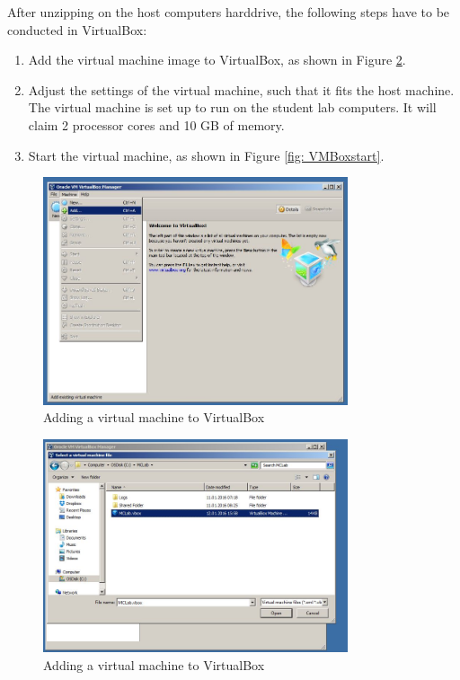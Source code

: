\documentclass[a4paper,twoside,english]{report}
\begin{document}
After unzipping on the host computers harddrive, the following steps
have to be conducted in VirtualBox:
\begin{enumerate}
\item Add the virtual machine image to VirtualBox, as shown in Figure \ref{fig: VMBoxadd}.
\item Adjust the settings of the virtual machine, such that it fits the
host machine. The virtual machine is set up to run on the student
lab computers. It will claim 2 processor cores and 10 GB of memory.
\item Start the virtual machine, as shown in Figure \ref{fig: VMBoxstart}.
\end{enumerate}
\begin{figure}[h!]
\centering \includegraphics[width=0.8\textwidth]{fig/VMBox1} \caption{Adding a virtual machine to VirtualBox \label{fig: VMBoxadd-1}}
\end{figure}
\begin{figure}
\centering\includegraphics[width=0.8\textwidth]{fig/VMBox2}

\caption{Adding a virtual machine to VirtualBox \label{fig: VMBoxadd}}
\end{figure}
\end{document}
